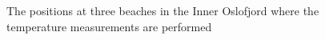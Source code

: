 \begin{figure}[htb]
{\begin{minipage}[r]{0.4\textwidth}
 \\
 \\
\end{minipage}
}
\caption{\small
The positions at three beaches in the Inner Oslofjord where the temperature measurements are performed}
\label{fig:kart_strand}
\end{figure}

